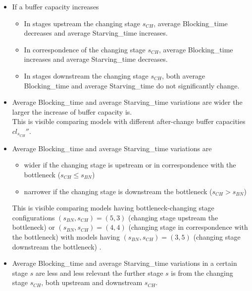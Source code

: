 \begin{itemize}
\item If a buffer capacity increases
\begin{itemize}
\item In stages upstream the changing stage $s_{CH}$, average Blocking\_time decreases and average Starving\_time increases.
\item In correspondence of the changing stage $s_{CH}$, average Blocking\_time increases and average Starving\_time decreases.
\item In stages downstream the changing stage $s_{CH}$, both average Blocking\_time and average Starving\_time do not significantly change.
\end{itemize}
\item Average Blocking\_time and average Starving\_time variations are wider the larger the increase of buffer capacity is. \\This is visible comparing models with different after-change buffer capacities $cl_{s_{CH}}''$. 
\item Average Blocking\_time and average Starving\_time variations are 
\begin{itemize}
\item wider if the changing stage is upstream or in correspondence with the bottleneck ($s_{CH} \leqslant s_{BN}$)
\item narrower if the changing stage is downstream the bottleneck ($s_{CH}>s_{BN}$)
\end{itemize}
This is visible comparing models having bottleneck-changing stage configurations $(s_{BN},s_{CH})=(5,3)$ (changing stage upstream the bottleneck) or $(s_{BN},s_{CH})=(4,4)$ (changing stage in correspondence with the bottleneck) with models having $(s_{BN},s_{CH})=(3,5)$ (changing stage downstream the bottleneck) . 
\item Average Blocking\_time and average Starving\_time variations in a certain stage $s$ are less and less relevant the further stage $s$ is from the changing stage $s_{CH}$, both upstream and downstream $s_{CH}$. 
\end{itemize}
